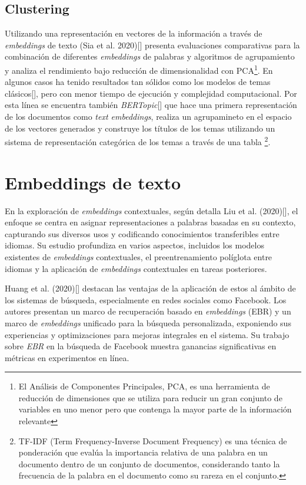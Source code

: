     \subsection{Clustering}
    Utilizando una representación en vectores de la información a través de \emph{embeddings} de texto (Sia et al. 2020)[\cite{sia2020tired}] presenta evaluaciones comparativas para la combinación de diferentes \emph{embeddings} de palabras y algoritmos de agrupamiento y analiza el rendimiento bajo reducción de dimensionalidad con PCA\footnote{El Análisis de Componentes Principales, PCA, es una herramienta de reducción de dimensiones que se utiliza para reducir un gran conjunto de variables en uno menor pero que contenga la mayor parte de la información relevante}. En algunos casos ha tenido resultados tan sólidos como los modelos de temas clásicos[\cite{sia2020tiredResults}], pero con menor tiempo de ejecución y complejidad computacional. 
    Por esta línea se encuentra también \emph{BERTopic}[\cite{bertopic}] que hace una primera representación de los documentos como \emph{text embeddings}, realiza un agrupamineto en el espacio de los vectores generados y construye los títulos de los temas utilizando un sistema de representación categórica de los temas a través de una tabla \footnote{TF-IDF (Term Frequency-Inverse Document Frequency) es una técnica de ponderación que evalúa la importancia relativa de una palabra en un documento dentro de un conjunto de documentos, considerando tanto la frecuencia de la palabra en el documento como su rareza en el conjunto.}.

\section{Embeddings de texto}
    En la exploración de \emph{embeddings} contextuales, según detalla Liu et al. (2020)[\cite{liu2020survey}], el enfoque se centra en asignar representaciones a palabras basadas en su contexto, capturando sus diversos usos y codificando conocimientos transferibles entre idiomas. Su estudio profundiza en varios aspectos, incluidos los modelos existentes de \emph{embeddings} contextuales, el preentrenamiento políglota entre idiomas y la aplicación de \emph{embeddings} contextuales en tareas posteriores.

    Huang et al. (2020)[\cite{Huang_2020}] destacan las ventajas de la aplicación de estos al ámbito de los sistemas de búsqueda, especialmente en redes sociales como Facebook. Los autores presentan un marco de recuperación basado en \emph{embeddings} (EBR) y un marco de \emph{embeddings} unificado para la búsqueda personalizada, exponiendo sus experiencias y optimizaciones para mejoras integrales en el sistema. Su trabajo sobre \emph{EBR} en la búsqueda de Facebook muestra ganancias significativas en métricas en experimentos en línea.

